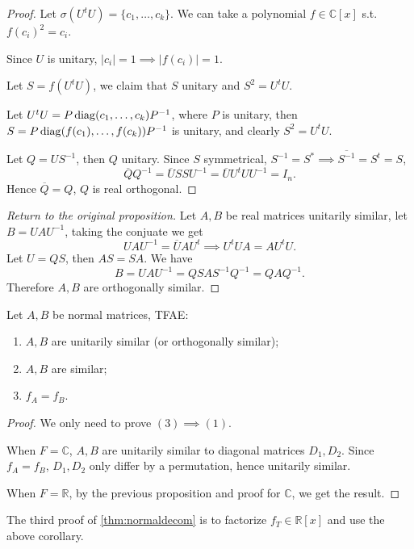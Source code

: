 \begin{proof}[Proof]
    Let $\sigma(U^tU) = \{c_1, \dots, c_k\}$.
	We can take a polynomial $f\in \mathbb{C}[x]$ s.t. $f(c_i)^2 = c_i$.

	Since $U$ is unitary, $|c_i| = 1 \implies |f(c_i)| = 1$.

	Let $S = f(U^tU)$, we claim that $S$ unitary and $S^2 = U^tU$.

	Let $U^tU = P\operatorname{diag}(c_1, \dots, c_k)P^{-1}$, where $P$ is unitary,
	then $S = P\operatorname{diag}(f(c_1), \dots, f(c_k))P^{-1}$ is unitary,
	and clearly $S^2 = U^tU$.

	Let $Q = US^{-1}$, then $Q$ unitary. Since $S$ symmetrical,
	$S^{-1} = S^*\implies \overline{S^{-1}} = S^t = S$,
	\[
	\overline{Q}Q^{-1} = \overline{U} S S U^{-1} = \overline{U}U^tU U^{-1} = I_n.
	\]
	Hence $\overline{Q} = Q$, $Q$ is real orthogonal.
\end{proof}

\begin{proof}[Return to the original proposition]
    Let $A, B$ be real matrices unitarily similar,
	let $B = UAU^{-1}$, taking the conjuate we get
	\[
	UAU^{-1} = \overline{U}AU^t \implies U^tUA = AU^tU.
	\]
	Let $U = QS$, then $AS = SA$. We have
	\[
	B = UAU^{-1} = QSAS^{-1}Q^{-1} = QAQ^{-1}.
	\]
	Therefore $A, B$ are orthogonally similar.
\end{proof}

\begin{corollary}
    Let $A, B$ be normal matrices, TFAE:
	\begin{enumerate}[\indent(1)]
		\item $A, B$ are unitarily similar (or orthogonally similar);
		\item $A, B$ are similar;
		\item $f_A = f_B$.
	\end{enumerate}
\end{corollary}
\begin{proof}[Proof]
    We only need to prove $(3)\implies (1)$.

	When $F = \mathbb{C}$, $A, B$ are unitarily similar to
	diagonal matrices $D_1, D_2$.
	Since $f_A = f_B$, $D_1, D_2$ only differ by a permutation,
	hence unitarily similar.

	When $F = \mathbb{R}$, by the previous proposition and proof for $\mathbb{C}$,
	we get the result.
\end{proof}

The third proof of \autoref{thm:normaldecom} is to
factorize $f_T \in \mathbb{R}[x]$ and use the above corollary.

